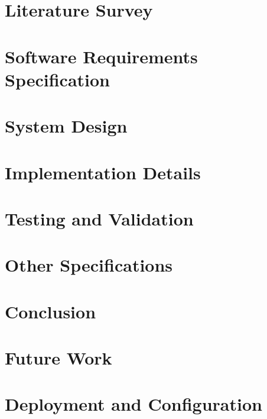 \documentclass[12pt,a4paper]{report}
\begin{document}
\chapter{Literature Survey}


\chapter{Software Requirements Specification}


\chapter{System Design}


\chapter{Implementation Details}


\chapter{Testing and Validation}


\chapter{Other Specifications}


\chapter{Conclusion}


\chapter{Future Work}


\appendix

\chapter{Deployment and Configuration}



\end{document}
